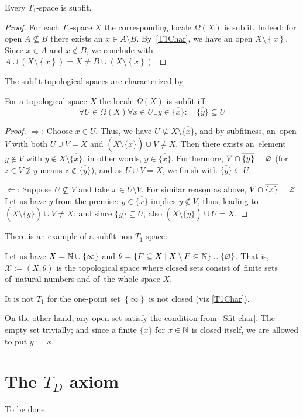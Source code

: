 \begin{thm} \label{T1->Sfit}
  Every $T_1$-space is subfit.
\end{thm}

\begin{proof}
  For each $T_1$-space $X$ the corresponding locale $\Omega(X)$ is subfit.
  Indeed: for open $A\not\subseteq B$ there exists an $x\in A \setminus B$.
  By~\ref{T1Char}\thinspace, we have an open $X\setminus \left\{x\right\}$.
  Since $x\in A$ and $x\not\in B$, we conclude with $A\cup (X\setminus
  \left\{x\right\}) = X \ne B \cup (X\setminus \left\{x\right\})$.
\end{proof}

The subfit topological spaces are characterized by

\begin{prop} \label{Sfit-char}
  For a topological space $X$ the locale $\Omega(X)$ is subfit iff
  \[
    \forall U\in\Omega(X) \forall x\in U \exists y\in \overline{\{x\}}: \quad
    \overline{\{y\}} \subseteq U
  \]
\end{prop}
\begin{proof}
  $\Rightarrow$:
  Choose $x \in U$.
  Thus, we have $U\not\subseteq X\setminus \overline{\{x\}}$, and by
  subfitness, an~open $V$ with both $U \cup V = X$ and $(X\setminus
  \overline{\{x\}}) \cup V \ne X$.
  Then there exists an~element $y\not\in V$ with $y\not\in X\setminus
  \overline{\{x\}}$, in other words, $y\in \overline{\{x\}}$.
  Furthermore, $V \cap \overline{\{y\}} = \varnothing$ (for $z \in V \not\owns y$
  means $z\not\in \overline{\{y\}}$), and as $U \cup V = X$, we finish with
  $\overline{\{y\}} \subseteq U$.

  $\Leftarrow$:
  Suppose $U\not\subseteq V$ and take $x\in U\setminus V$.
  For similar reason as above, $V \cap \overline{\{x\}} = \varnothing$.
  Let us have $y$ from the premise:
  $y \in \overline{\{x\}}$ implies  $y\not\in V$, thus, leading to $(X\setminus
  \overline{\{y\}}) \cup V \ne X$;
  and since $\overline{\{y\}} \subseteq U$, also $(X\setminus \overline{\{y\}})
  \cup U = X$.
\end{proof}

There is an example of a subfit non-$T_1$-space:

\begin{exmpl}
  Let us have $X = \mathbb{N} \cup \left\{\infty\right\}$ and $\theta = \left\{
  F\subseteq X \mid X\setminus F \Subset \mathbb{N} \right\} \cup \left\{ \varnothing
  \right\}$.
  That is, $\mathcal{X} := (X, \theta)$ is the topological space where closed
  sets consist of~finite sets of~natural numbers and of~the whole space $X$.

  It is not $T_1$ for the one-point set $\left\{ \infty \right\}$ is not
  closed (viz \ref{T1Char}).

  On the other hand, any open set satisfy the condition
  from~\ref{Sfit-char}\thinspace.
  The empty set trivially;
  and since a finite $\{x\}$ for $x\in \mathbb{N}$ is closed itself, we are allowed to
  put $y := x$.
\end{exmpl}

\section{The $T_D$ axiom}

To be done.

